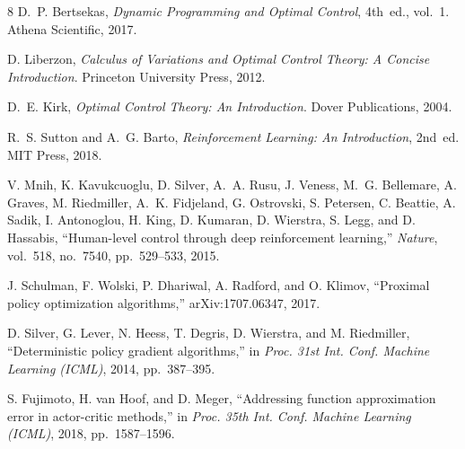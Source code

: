 \documentclass[11pt]{article}
\begin{document}
\begin{thebibliography}{8}
D.~P. Bertsekas, \emph{Dynamic Programming and Optimal Control}, 4th~ed., vol.~1. Athena Scientific, 2017.

D. Liberzon, \emph{Calculus of Variations and Optimal Control Theory: A Concise Introduction}. Princeton University Press, 2012.

D.~E. Kirk, \emph{Optimal Control Theory: An Introduction}. Dover Publications, 2004.

R.~S. Sutton and A.~G. Barto, \emph{Reinforcement Learning: An Introduction}, 2nd~ed. MIT Press, 2018.

V. Mnih, K. Kavukcuoglu, D. Silver, A.~A. Rusu, J. Veness, M.~G. Bellemare, A. Graves, M. Riedmiller, A.~K. Fidjeland, G. Ostrovski, S. Petersen, C. Beattie, A. Sadik, I. Antonoglou, H. King, D. Kumaran, D. Wierstra, S. Legg, and D. Hassabis, ``Human-level control through deep reinforcement learning,'' \emph{Nature}, vol.~518, no.~7540, pp.~529--533, 2015.

J. Schulman, F. Wolski, P. Dhariwal, A. Radford, and O. Klimov, ``Proximal policy optimization algorithms,'' arXiv:1707.06347, 2017.

D. Silver, G. Lever, N. Heess, T. Degris, D. Wierstra, and M. Riedmiller, ``Deterministic policy gradient algorithms,'' in \emph{Proc. 31st Int. Conf. Machine Learning (ICML)}, 2014, pp.~387--395.

S. Fujimoto, H. van Hoof, and D. Meger, ``Addressing function approximation error in actor-critic methods,'' in \emph{Proc. 35th Int. Conf. Machine Learning (ICML)}, 2018, pp.~1587--1596.
\end{thebibliography}
\end{document}

